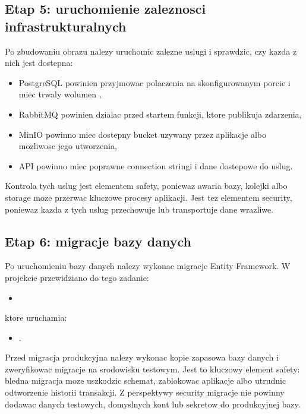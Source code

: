 \documentclass[12pt,a4paper]{article}
\begin{document}
\subsection{Etap 5: uruchomienie zaleznosci infrastrukturalnych}

Po zbudowaniu obrazu nalezy uruchomic zalezne uslugi i sprawdzic, czy kazda z nich jest dostepna:

\begin{itemize}
    \item PostgreSQL powinien przyjmowac polaczenia na skonfigurowanym porcie i miec trwaly wolumen ,
    \item RabbitMQ powinien dzialac przed startem funkcji, ktore publikuja zdarzenia,
    \item MinIO powinno miec dostepny bucket uzywany przez aplikacje albo mozliwosc jego utworzenia,
    \item API powinno miec poprawne connection stringi i dane dostepowe do uslug.
\end{itemize}

Kontrola tych uslug jest elementem safety, poniewaz awaria bazy, kolejki albo storage moze przerwac kluczowe procesy aplikacji. Jest tez elementem security, poniewaz kazda z tych uslug przechowuje lub transportuje dane wrazliwe.

\subsection{Etap 6: migracje bazy danych}

Po uruchomieniu bazy danych nalezy wykonac migracje Entity Framework. W projekcie przewidziano do tego zadanie:

\begin{itemize}
    \item {}
\end{itemize}

ktore uruchamia:

\begin{itemize}
    \item {}.
\end{itemize}

Przed migracja produkcyjna nalezy wykonac kopie zapasowa bazy danych i zweryfikowac migracje na srodowisku testowym. Jest to kluczowy element safety: bledna migracja moze uszkodzic schemat, zablokowac aplikacje albo utrudnic odtworzenie historii transakcji. Z perspektywy security migracje nie powinny dodawac danych testowych, domyslnych kont lub sekretow do produkcyjnej bazy.
\end{document}
